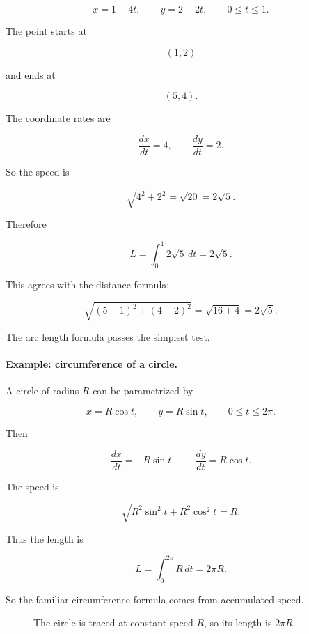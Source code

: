 \[
x=1+4t,
\qquad
y=2+2t,
\qquad
0\le t\le1.
\]

The point starts at

\[
(1,2)
\]

and ends at

\[
(5,4).
\]

The coordinate rates are

\[
\frac{dx}{dt}=4,
\qquad
\frac{dy}{dt}=2.
\]

So the speed is

\[
\sqrt{4^2+2^2}=\sqrt{20}=2\sqrt5.
\]

Therefore

\[
L=\int_0^1 2\sqrt5\,dt=2\sqrt5.
\]

This agrees with the distance formula:

\[
\sqrt{(5-1)^2+(4-2)^2}
=
\sqrt{16+4}
=
2\sqrt5.
\]

The arc length formula passes the simplest test.

\paragraph{Example: circumference of a circle.}
A circle of radius \(R\) can be parametrized by

\[
x=R\cos t,
\qquad
y=R\sin t,
\qquad
0\le t\le 2\pi.
\]

Then

\[
\frac{dx}{dt}=-R\sin t,
\qquad
\frac{dy}{dt}=R\cos t.
\]

The speed is

\[
\sqrt{R^2\sin^2t+R^2\cos^2t}
=
R.
\]

Thus the length is

\[
L=\int_0^{2\pi} R\,dt=2\pi R.
\]

So the familiar circumference formula comes from accumulated speed.

\begin{figure}[h]
\centering
{}
\caption{The circle is traced at constant speed \(R\), so its length is \(2\pi R\).}
\label{fig:parametric-circle-length}
\end{figure}

